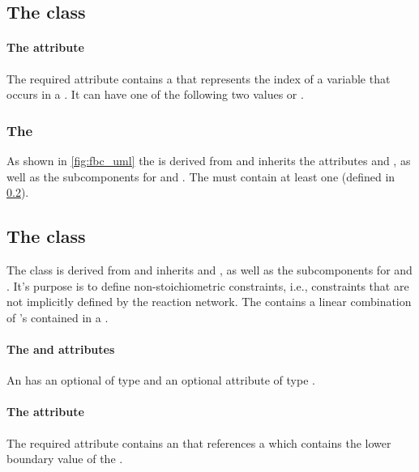 \subsection{The \FBC {} class}
\paragraph{The  attribute}
The required  attribute contains a  that
represents the index of a variable that occurs in a \FluxObjective. It can have one
of the following two values  or .

\subsubsection{The \FBC {}}
\label{listofuserconstraints-class}
As shown in \ref{fig:fbc_uml} the \ListOfUserConstraints is derived from \SBase
and inherits the attributes  and , as well as
the subcomponents for \Annotation and \Notes. The
\ListOfUserConstraints must contain at least one \UserConstraint (defined in
\ref{userconstraint-class}).

\subsection{The \FBC {} class}
\label{userconstraint-class}
\label{listoftuples-class}

The \FBC \UserConstraint class is derived from \SBML \SBase and inherits
 and , as well as the subcomponents for
\Annotation and \Notes. It's purpose is to define non-stoichiometric constraints, i.e., constraints that are not implicitly defined by the reaction network. The \UserConstraint contains a linear combination of \UserConstraintComponent's contained in a \ListOfUserConstraintComponents.

\paragraph{The  and  attributes}
An \UserConstraint has an optional  of type
 and an optional attribute  of type .

\paragraph{The  attribute}
The required  attribute contains an  that references a \Parameter which contains the lower boundary value of the \UserConstraint.

